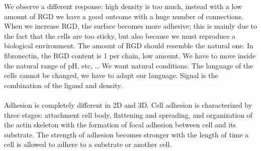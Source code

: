 \noindent
We observe a different response: high density is too much,  instead with a low amount of RGD we have a good outcome with a huge number of connections. When we increase RGD, the surface becomes more adhesive; this is mainly due to the fact that the cells are too sticky, but also because we must reproduce a biological environment. The amount of RGD should resemble the natural one. In fibronectin, the RGD content is 1 per chain, low amount. We have to move inside the natural range of pH, etc, … We want natural conditions. The language of the cells cannot be changed, we have to adapt our language. Signal is the combination of the ligand and density.
 \\
 \\
 \noindent
Adhesion is completely different in 2D and 3D. Cell adhesion is characterized by three stages: attachment cell body, flattening and spreading, and organization of the actin skeleton with the formation of focal adhesion between cell and its substrate. The strength of adhesion becomes stronger with the length of time a cell is allowed to adhere to a substrate or another cell.

